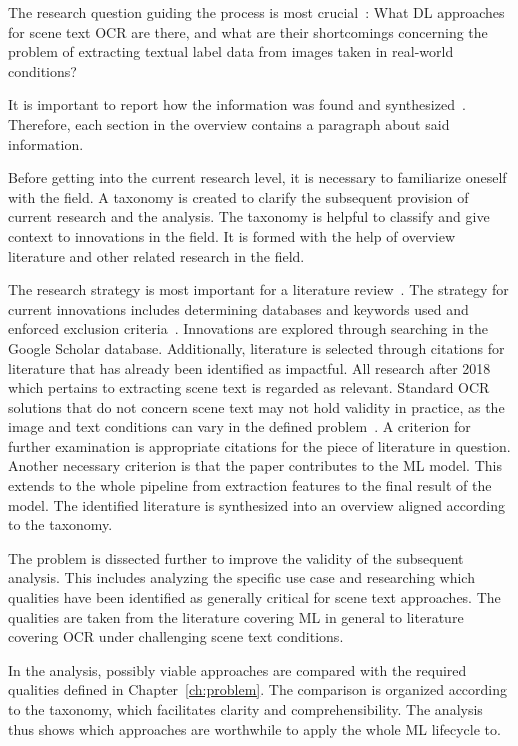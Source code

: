 The research question guiding the process is most crucial~\citep{snyder_literature_2019}:
What \ac{DL} approaches for scene text \ac{OCR} are there, and what are their shortcomings concerning
the problem of extracting textual label data from images taken in real-world conditions?

It is important to report how the information was found and
synthesized~\citep{torraco_writing_2005}.
Therefore, each section in the overview contains a paragraph about said information.

Before getting into the current research level, it is necessary to familiarize oneself with the
field.
A taxonomy is created to clarify the subsequent provision of current research and
the analysis.
The taxonomy is helpful to classify and give context to innovations in the field.
It is formed with the help of overview literature and other related research in the field.

The research strategy is most important for a literature
review~\citep{snyder_literature_2019}.
The strategy for current innovations includes determining databases and keywords
used and enforced exclusion criteria~\citep{torraco_writing_2005}.
Innovations are explored through searching in the Google Scholar database.
Additionally, literature is selected through citations for literature that has already been
identified as impactful.
All research after 2018 which pertains to extracting scene text is regarded as relevant.
Standard \ac{OCR} solutions that do not concern scene text may not hold validity in practice, as
the image and text conditions can vary in the defined problem~\citep{chen_text_2021}.
A criterion for further examination is appropriate citations for the piece of literature
in question.
Another necessary criterion is that the paper contributes to the \ac{ML} model.
This extends to the whole pipeline from extraction features to the final result of the model.
The identified literature is synthesized into an overview aligned according to the taxonomy.

The problem is dissected further to improve the validity of the subsequent analysis.
This includes analyzing the specific use case and researching which qualities have been
identified as generally critical for scene text approaches.
The qualities are taken from the literature covering \ac{ML} in general to literature
covering \ac{OCR} under challenging scene text conditions.

In the analysis, possibly viable approaches are compared with the required qualities defined
in Chapter~\ref{ch:problem}.
The comparison is organized according to the taxonomy, which facilitates clarity and
comprehensibility.
The analysis thus shows which approaches are worthwhile to apply the whole \ac{ML} lifecycle to.

